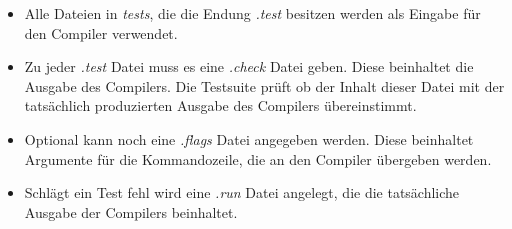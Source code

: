 \documentclass[a4paper,11pt,titlepage,openany,oneside]{scrbook}
\begin{document}
\begin{itemize}
  \item Alle Dateien in \textit{tests}, die die Endung \textit{.test} besitzen werden als Eingabe für den Compiler verwendet.
  \item Zu jeder \textit{.test} Datei muss es eine \textit{.check} Datei geben. Diese beinhaltet die Ausgabe des Compilers. Die Testsuite prüft ob der Inhalt dieser Datei mit der tatsächlich produzierten Ausgabe des Compilers übereinstimmt.
  \item Optional kann noch eine \textit{.flags} Datei angegeben werden. Diese beinhaltet Argumente für die Kommandozeile, die an den Compiler übergeben werden.
  \item Schlägt ein Test fehl wird eine \textit{.run} Datei angelegt, die die tatsächliche Ausgabe der Compilers beinhaltet.
\end{itemize}
\end{document}
